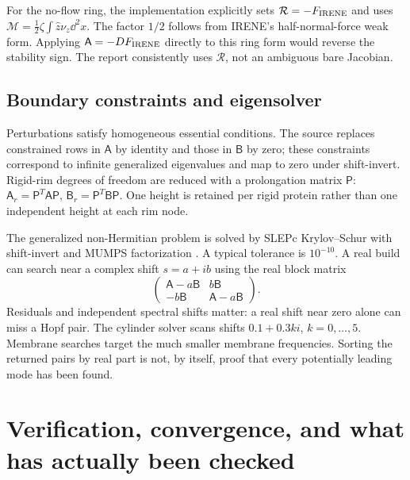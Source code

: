 For the no-flow ring, the implementation explicitly sets $\mathcal R=-F_{\rm IRENE}$ and uses $\mathcal M=\tfrac12\zeta\int\widehat z\nu_z\dd^2x$. The factor $1/2$ follows from IRENE's half-normal-force weak form. Applying $\mathsf A=-DF_{\rm IRENE}$ directly to this ring form would reverse the stability sign. The report consistently uses $\mathcal R$, not an ambiguous bare Jacobian.

\subsection{Boundary constraints and eigensolver}
Perturbations satisfy homogeneous essential conditions. The source replaces constrained rows in $\mathsf A$ by identity and those in $\mathsf B$ by zero; these constraints correspond to infinite generalized eigenvalues and map to zero under shift-invert. Rigid-rim degrees of freedom are reduced with a prolongation matrix $\mathsf P$: $\mathsf A_r=\mathsf P^T\mathsf A\mathsf P$, $\mathsf B_r=\mathsf P^T\mathsf B\mathsf P$. One height is retained per rigid protein rather than one independent height at each rim node.

The generalized non-Hermitian problem is solved by SLEPc Krylov--Schur with shift-invert and MUMPS factorization \cite{slepc}. A typical tolerance is $10^{-10}$. A real build can search near a complex shift $s=a+ib$ using the real block matrix
\begin{equation}
\begin{pmatrix}\mathsf A-a\mathsf B&b\mathsf B\\-b\mathsf B&\mathsf A-a\mathsf B\end{pmatrix}.
\end{equation}
Residuals and independent spectral shifts matter: a real shift near zero alone can miss a Hopf pair. The cylinder solver scans shifts $0.1+0.3ki$, $k=0,\ldots,5$. Membrane searches target the much smaller membrane frequencies. Sorting the returned pairs by real part is not, by itself, proof that every potentially leading mode has been found.

\section{Verification, convergence, and what has actually been checked}
